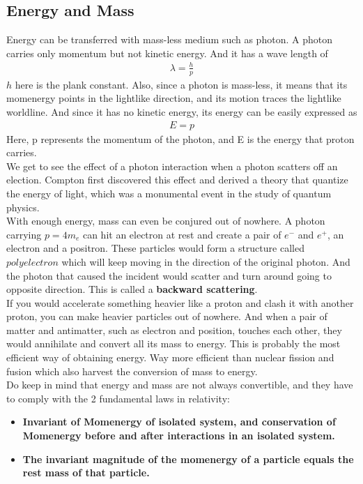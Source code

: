 \documentclass[11pt,letterpaper]{book}
\begin{document}
\subsection{Energy and Mass}
Energy can be transferred with mass-less medium such as photon. A photon carries only momentum but not kinetic energy. And it has a wave length of 
\begin{align}
\lambda = \frac{h}{p}
\end{align}
$h$ here is the plank constant. Also, since a photon is mass-less, it means that its momenergy points in the lightlike direction, and its motion traces the lightlike worldline. And since it has no kinetic energy, its energy can be easily expressed as 
\begin{align}
E = p 
\end{align}
Here, p represents the momentum of the photon, and E is the energy that proton carries. \\


We get to see the effect of a photon interaction when a photon scatters off an election. Compton first discovered this effect and derived a theory that quantize the energy of light, which was a monumental event in the study of quantum physics.\\

With enough energy, mass can even be conjured out of nowhere. A photon carrying $p=4m_e$ can hit an electron at rest and create a pair of $e^-$ and $e^+$, an electron and a positron. These particles would form a structure called $polyelectron$ which will keep moving in the direction of the original photon. And the photon that caused the incident would scatter and turn around going to opposite direction. This is called a \textbf{backward scattering}. \\

If you would accelerate something heavier like a proton and clash it with another proton, you can make heavier particles out of nowhere. And when a pair of matter and antimatter, such as electron and position, touches each other, they would annihilate and convert all its mass to energy. This is probably the most efficient way of obtaining energy. Way more efficient than nuclear fission and fusion which also harvest the conversion of mass to energy. \\

Do keep in mind that energy and mass are not always convertible, and they have to comply with the 2 fundamental laws in relativity:
\begin{itemize}
    \item \textbf{Invariant of Momenergy of isolated system, and conservation of Momenergy before and after interactions in an isolated system.}
    \item \textbf{The invariant magnitude of the momenergy of a particle equals the rest mass of that particle. }
\end{itemize}
\end{document}
